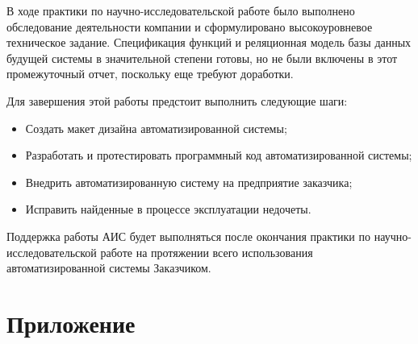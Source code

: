 \documentclass[a4paper,12pt]{article}
\begin{document}
В ходе практики по научно-исследовательской работе было выполнено обследование деятельности компании и сформулировано высокоуровневое техническое задание. Спецификация функций и реляционная модель базы данных будущей системы в значительной степени готовы, но не были включены в этот промежуточный отчет, поскольку еще требуют доработки.

Для завершения этой работы предстоит выполнить следующие шаги:
\begin{itemize}
    \item Создать макет дизайна автоматизированной системы;
    \item Разработать и протестировать программный код автоматизированной системы;
    \item Внедрить автоматизированную систему на предприятие заказчика;
    \item Исправить найденные в процессе эксплуатации недочеты.
\end{itemize}

Поддержка работы АИС будет выполняться после окончания практики по научно-исследовательской работе на протяжении всего использования автоматизированной системы Заказчиком.






% 
% 




\newpage
\section*{Приложение}
\end{document}

